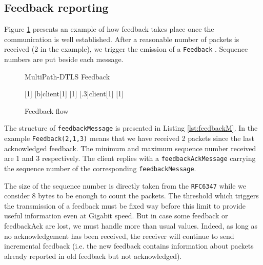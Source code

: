 \subsection{Feedback reporting}
\label{sec:feedbackReport}


Figure \ref{fig:feedback} presents an example of how feedback takes place once the communication is well established. After a reasonable number of packets is received (2 in the example), we trigger the emission of a \verb!Feedback! . Sequence numbers are put beside each message.


\begin{figure}[!h]
\centering
\begin{msc}[r]{MultiPath-DTLS Feedback}

\setlength{\instfootheight}{0em}
\setlength{\instheadheight}{0em}
\setlength{\instdist}{0.5\linewidth}
\setlength{\levelheight}{3em}


[1]
\nextlevel
{}[b]{}{client}[1]
\nextlevel
{}[1]
\nextlevel
{}[.3]{client}[1]
\nextlevel
{}[1]
\nextlevel

\end{msc}
\caption{Feedback flow}
\label{fig:feedback}
\end{figure}

The structure of \verb!feedbackMessage! is presented in Listing \ref{lst:feedbackM}. In the example \verb!Feedback(2,1,3)! means that we have received 2 packets since the last acknowledged feedback. The minimum and maximum sequence number received are 1 and 3 respectively. The client replies with a \verb!feedbackAckMessage! carrying the sequence number of the corresponding \verb!feedbackMessage!.

The size of the sequence number is directly taken from the \verb!RFC6347!\cite{rfc6347} while we consider 8 bytes to be enough to count the packets. The threshold which triggers the transmission of a feedback must be fixed way before this limit to provide useful information even at Gigabit speed. But in case some feedback or feedbackAck are lost, we must handle more than usual values. Indeed, as long as no acknowledgement has been received, the receiver will continue to send incremental feedback (i.e. the new feedback contains information about packets already reported in old feedback but not acknowledged).


